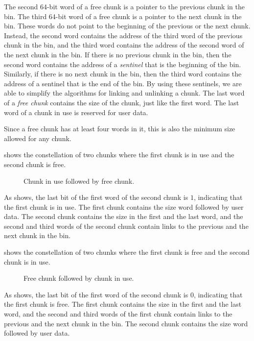 The second 64-bit word of a free chunk is a pointer to the previous
chunk in the bin.  The third 64-bit word of a free chunk is a pointer
to the next chunk in the bin.  These words do not point to the
beginning of the previous or the next chunk.  Instead, the second word
contains the address of the third word of the previous chunk in the
bin, and the third word contains the address of the second word of the
next chunk in the bin.  If there is no previous chunk in the bin, then
the second word contains the address of a \emph{sentinel} that is the
beginning of the bin.  Similarly, if there is no next chunk in the
bin, then the third word contains the address of a sentinel that is
the end of the bin.  By using these sentinels, we are able to simplify
the algorithms for linking and unlinking a chunk.  The last word of a
\emph{free chunk} contains the size of the chunk, just like the first
word.  The last word of a chunk in use is reserved for user data.

Since a free chunk has at least four words in it, this is also the
minimum size allowed for any chunk.

 shows the constellation of two chunks where the
first chunk is in use and the second chunk is free.

\begin{figure}
\begin{center}
\end{center}
\caption{\label{fig-chunks2}
Chunk in use followed by free chunk.}
\end{figure}

As  shows, the last bit of the first word of the
second chunk is $1$, indicating that the first chunk is in use.  The
first chunk contains the size word followed by user data.  The second
chunk contains the size in the first and the last word, and the second
and third words of the second chunk contain links to the previous and
the next chunk in the bin.

 shows the constellation of two chunks where the
first chunk is free and the second chunk is in use.

\begin{figure}
\begin{center}
\end{center}
\caption{\label{fig-chunks3}
Free chunk followed by chunk in use.}
\end{figure}

As  shows, the last bit of the first word of the
second chunk is $0$, indicating that the first chunk is free.  The
first chunk contains the size in the first and the last word, and the
second and third words of the first chunk contain links to the
previous and the next chunk in the bin.  The second chunk contains the
size word followed by user data.

